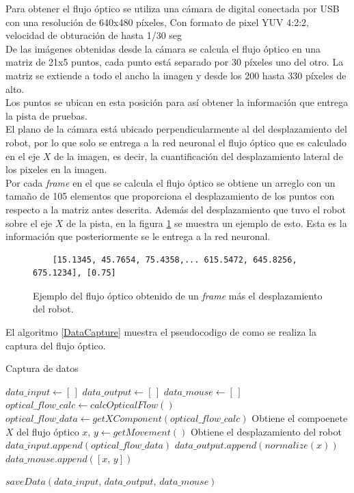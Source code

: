 \documentclass{iccmemoria}
\begin{document}
Para obtener el flujo óptico se utiliza una cámara de digital conectada por USB con una resolución de 640x480 píxeles, Con formato de pixel YUV 4:2:2, velocidad de obturación de hasta 1/30 seg\\

De las imágenes obtenidas desde la cámara se calcula el flujo óptico en una matriz de 21x5 puntos, cada punto está separado por 30 píxeles uno del otro. La matriz se extiende a todo el ancho la imagen y desde los 200 hasta 330 píxeles de alto.\\

Los puntos se ubican en esta posición para así obtener la información que entrega la pista de pruebas.\\

El plano de la cámara está ubicado perpendicularmente al del desplazamiento del robot, por lo que solo se entrega a la red neuronal el flujo óptico que es calculado en el eje $X$ de la imagen, es decir, la cuantificación del desplazamiento lateral de los pixeles en la imagen.\\

Por cada \emph{frame} en el que se calcula el flujo óptico se obtiene un arreglo con un tamaño de 105 elementos que proporciona el desplazamiento de los puntos con respecto a la matriz antes descrita. Además del desplazamiento que tuvo el robot sobre el eje $X$ de la pista, en la figura \ref{fig:optical_flow} se muestra un ejemplo de esto. Esta es la información que posteriormente se le entrega a la red neuronal.\\

\begin{figure}[H]
\centering
\begin{verbatim}
	[15.1345, 45.7654, 75.4358,... 615.5472, 645.8256, 675.1234], [0.75]
\end{verbatim}
\caption[Captura del flujo óptico de un \emph{frame}.]{Ejemplo del flujo óptico obtenido de un \emph{frame} más el desplazamiento del robot.}
  \label{fig:optical_flow}
\end{figure}

El algoritmo \ref{DataCapture} muestra el pseudocodigo de como se realiza la captura del flujo óptico.

\begin{algorithm}
\caption{Captura de datos}\label{DataCapture}
\begin{algorithmic}[1]
\State $data\_input \gets [\,]$
\State $data\_output \gets [\,]$
\State $data\_mouse \gets [\,]$
\State $optical\_flow\_calc \gets calcOpticalFlow()$ 
\State $optical\_flow\_data \gets getXComponent(optical\_flow\_calc)$ \Comment Obtiene el compoenete $X$ del flujo óptico
\State $x,\, y \gets getMovement()$ \Comment Obtiene el desplazamiento del robot
\State $data\_input.append(optical\_flow\_data)$
\State $data\_output.append(normalize(x))$
\State $data\_mouse.append([x,\, y])$
\EndWhile

\State $saveData(data\_input,\, data\_output,\, data\_mouse)$
\EndFunction
\end{algorithmic}
\end{algorithm}
\end{document}
